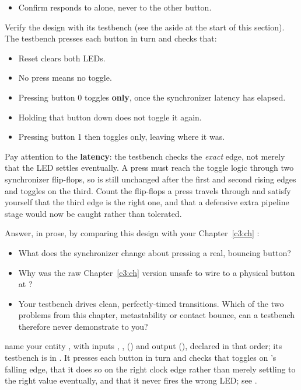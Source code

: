 \begin{parts}
\begin{itemize}
      \item Confirm  responds to  alone, never to the other button.
    \end{itemize}
  \item Verify the design with its testbench (see the aside at the start of this section). The
    testbench presses each button in turn and checks that:
    \begin{itemize}
      \item Reset clears both LEDs.
      \item No press means no toggle.
      \item Pressing button 0 toggles  \textbf{only}, once the synchronizer latency has
        elapsed.
      \item Holding that button down does not toggle it again.
      \item Pressing button 1 then toggles  only, leaving  where it was.
    \end{itemize}
    Pay attention to the \textbf{latency}: the testbench checks the \emph{exact} edge, not merely
    that the LED settles eventually. A press must reach the toggle logic through two synchronizer
    flip-flops, so  is still unchanged after the first and second rising edges and toggles
    on the third. Count the flip-flops a press travels through and satisfy yourself that the third
    edge is the right one, and that a defensive extra pipeline stage would now be caught rather than
    tolerated.
  \item Answer, in prose, by comparing this design with your Chapter~\ref{c3:ch} :
    \begin{itemize}
      \item What does the synchronizer change about pressing a real, bouncing button?
      \item Why was the raw Chapter~\ref{c3:ch} version unsafe to wire to a physical button at
        ?
      \item Your testbench drives clean, perfectly-timed transitions. Which of the two problems
        from this chapter, metastability or contact bounce, can a testbench therefore never
        demonstrate to you?
    \end{itemize}
\end{parts}


\selfcheck name your entity , with inputs , ,
 () and output 
(), declared in that order; its testbench is in
. It presses each button in turn and checks that 
toggles on 's falling edge, that it does so on the right clock edge rather than
merely settling to the right value eventually, and that it never fires the wrong LED; see
.
